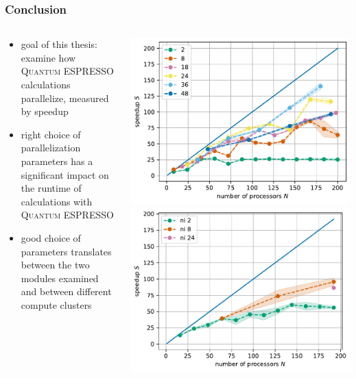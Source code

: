\documentclass[aspectratio=169]{beamer}
\newcommand{\QE}{\textsc{Quantum} ESPRESSO\xspace}
\begin{document}
\begin{frame}
	\frametitle{Conclusion}


	\begin{columns}
		\begin{column}{0.5\textwidth}
			\begin{itemize}
				\item goal of this thesis: examine how \QE calculations parallelize, measured by speedup
				\pause\item right choice of parallelization parameters has a significant impact on the runtime of calculations with \QE
				\pause\item good choice of parameters translates between the two modules examined and between different compute clusters
			\end{itemize}
		\end{column}
		\begin{column}{0.5\textwidth}
			\centering
			\pause[2]\includegraphics[height=0.5\textheight]{figs/TaS2_intel_bench_nk_speedup.pdf}
			\pause[2]\includegraphics[height=0.5\textheight]{figs/si_ph_poolsize_8_bench_ni_speedup.pdf}
		\end{column}
	\end{columns}

\end{frame}
\end{document}
